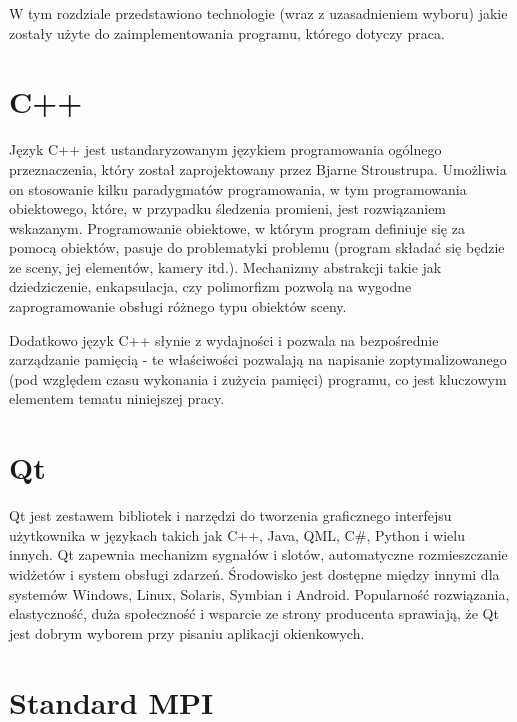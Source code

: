 W tym rozdziale przedstawiono technologie (wraz z uzasadnieniem wyboru) jakie zostały użyte do zaimplementowania programu, którego dotyczy praca.

\section{C++}

Język C++ jest ustandaryzowanym językiem programowania ogólnego przeznaczenia, który został zaprojektowany przez Bjarne Stroustrupa. Umożliwia on stosowanie kilku paradygmatów programowania, w tym programowania obiektowego, które, w przypadku śledzenia promieni, jest rozwiązaniem wskazanym. Programowanie obiektowe, w którym program definiuje się za pomocą obiektów, pasuje do problematyki problemu (program składać się będzie ze sceny, jej elementów, kamery itd.). Mechanizmy abstrakcji takie jak dziedziczenie, enkapsulacja, czy polimorfizm pozwolą na wygodne zaprogramowanie obsługi różnego typu obiektów sceny.

Dodatkowo język C++ słynie z wydajności i pozwala na bezpośrednie zarządzanie pamięcią - te właściwości pozwalają na napisanie zoptymalizowanego (pod względem czasu wykonania i zużycia pamięci) programu, co jest kluczowym elementem tematu niniejszej pracy. 

\section{Qt}

Qt jest zestawem bibliotek i narzędzi do tworzenia graficznego interfejsu użytkownika w językach takich jak C++, Java, QML, C\#, Python i wielu innych. Qt zapewnia mechanizm sygnałów i slotów, automatyczne rozmieszczanie widżetów i system obsługi zdarzeń. Środowisko jest dostępne między innymi dla systemów Windows, Linux, Solaris, Symbian i Android. Popularność rozwiązania, elastyczność, duża społeczność i wsparcie ze strony producenta \cite{qt} sprawiają, że Qt jest dobrym wyborem przy pisaniu aplikacji okienkowych.


\section{Standard MPI}

